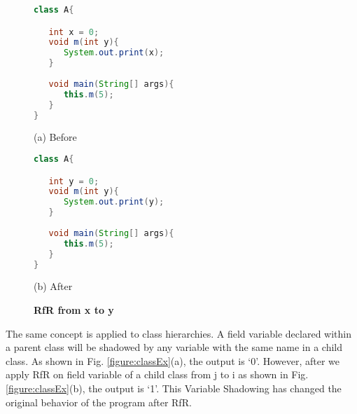 \begin{figure}[th]
\centering
\begin{minipage}[t]{0.47\linewidth}
\begin{lstlisting}[language=java, basicstyle=\scriptsize\ttfamily,frame=single]
class A{

   int x = 0;
   void m(int y){
      System.out.print(x);
   }
	
   void main(String[] args){
      this.m(5);
   }
}

\end{lstlisting}
\centering(a) Before
\end{minipage}
\hfill
\begin{minipage}[t]{0.47\linewidth}
\begin{lstlisting}[language=java, basicstyle=\scriptsize\ttfamily,frame=single]
class A{

   int y = 0;
   void m(int y){
      System.out.print(y);
   }
	
   void main(String[] args){
      this.m(5);
   }
}\end{lstlisting}
\centering(b) After
\end{minipage}
\caption{\textbf{RfR from x to y}}
\label{figure:sameBlock}
\end{figure}

The same concept is applied to class hierarchies. A field variable declared within a parent class will be shadowed by any variable with the same name in a child class. As shown in Fig. \ref{figure:classEx}(a), the output is `0'. However, after we apply RfR on field variable of a child class from j to i as shown in Fig. \ref{figure:classEx}(b), the output is `1'. This Variable Shadowing has changed the original behavior of the program after RfR. 

